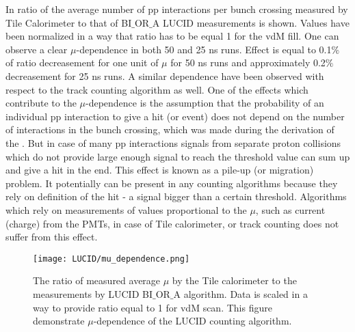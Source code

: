 In  ratio of the average number of pp interactions per bunch crossing measured by Tile Calorimeter to that of BI$\_$OR$\_$A LUCID measurements is shown.
Values have been normalized in a way that ratio has to be equal 1 for the vdM fill.
One can observe a clear $\mu$-dependence in both 50 and 25 ns runs. Effect is equal to 0.1$\%$ of ratio decreasement for one unit of $\mu$ for 50 ns runs and approximately 0.2$\%$
decreasement for 25 ns runs.
A similar dependence have been observed with respect to the track counting algorithm as well.
One of the effects which contribute to the $\mu$-dependence is the assumption that the probability of an individual pp interaction to give a hit (or event) does not depend on the number of interactions in the bunch crossing, which was made during the derivation of the .
But in case of many pp interactions signals from separate proton collisions which do not provide large enough signal to reach the threshold value can sum up and give a hit in the end. 
This effect is known as a pile-up (or migration) problem.
It potentially can be present in any counting algorithms because they rely on definition of the hit - a signal bigger than a certain threshold.
Algorithms which rely on measurements of values proportional to the $\mu$, such as current (charge) from the PMTs, in case of Tile calorimeter, or track counting does not suffer from this effect.



\begin{figure}
\centering
\texttt{[image: LUCID/mu\_dependence.png]}
\caption{The ratio of measured average $\mu$ by the Tile calorimeter to the measurements by LUCID BI$\_$OR$\_$A algorithm. Data is scaled in a way to provide ratio equal to 1 for vdM scan.
This figure demonstrate $\mu$-dependence of the LUCID counting algorithm.}
\label{fig:mu_dependence}
\end{figure}

